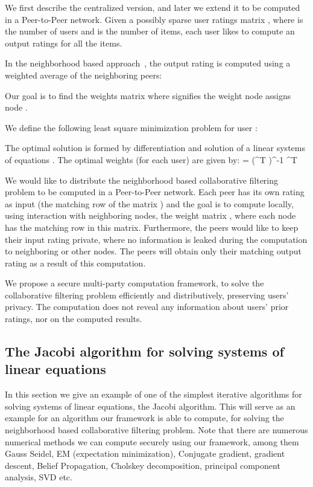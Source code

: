 \documentclass[times, 10pt,twocolumn]{article}
\begin{document}
We first describe the centralized version, and later we extend it
to be computed in a Peer-to-Peer network. Given a possibly sparse
user ratings matrix , where  is the number of
users and  is the number of items, each user likes to compute
an output ratings for all the items.

In the neighborhood based approach~\cite{KorenCF}, the output
rating is computed using a weighted average of the neighboring
peers:

Our goal is to find the weights matrix  where 
signifies the weight node  assigns node .

We define the following least square minimization problem for user
 :


The optimal solution is formed by differentiation and solution of
a linear systems of equations . The optimal weights
(for each user) are given by: \BE \label{eqw} \vw = (\mR^T
\mR)^{-1} \mR^T \vb \EE

We would like to distribute the neighborhood based collaborative
filtering problem to be computed in a Peer-to-Peer network. Each
peer has its own rating as input (the matching row of the matrix
) and the goal is to compute locally, using interaction with
neighboring nodes, the weight matrix , where each node has
the matching row in this matrix. Furthermore, the peers would like
to keep their input rating private, where no information is leaked
during the computation to neighboring or other nodes. The peers
will obtain only their matching output rating as a result of this
computation.

We propose a secure multi-party computation framework, to solve the
collaborative filtering problem efficiently and distributively,
preserving users' privacy. The computation does not reveal any
information about users' prior ratings, nor on the computed
results.

\subsection{The Jacobi algorithm for solving systems of
linear equations}\label{Jacobi} In this section we give an example
of one of the simplest iterative algorithms for solving systems of
linear equations, the Jacobi algorithm. This will serve as an
example for an algorithm our framework is able to compute, for
solving the neighborhood based collaborative filtering problem.
Note that there are numerous numerical methods we can compute
securely using our framework, among them Gauss Seidel, EM
(expectation minimization), Conjugate gradient, gradient descent,
Belief Propagation, Cholskey decomposition, principal component
analysis, SVD etc.
\end{document}
